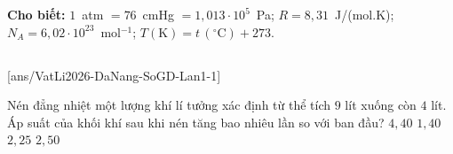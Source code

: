\def\CheDo{solcolor}%
\def\tenchuong{Sở GD\&ĐT Đà Nẵng -- Lần 1}
\def\thuonghieu{VẬT LÍ 12 -- Eduzy.com.vn}
\def\TachCauDS{1}
\def\TachCauLG{1}




	\noindent\textbf{Cho biết:} $1$~atm $=76$~cmHg $=1{,}013\cdot 10^5$~Pa; $R=8{,}31$~J/(mol.K); $N_A=6{,}02\cdot 10^{23}$~mol$^{-1}$; $T(\text{K})=t\,(^\circ\text{C})+273$.

	\noindent
	\subsection*{}
	\setcounter{ex}{0}
	[ans/VatLi2026-DaNang-SoGD-Lan1-1]

	\begin{ex}%
		Nén đẳng nhiệt một lượng khí lí tưởng xác định từ thể tích $9$ lít xuống còn $4$ lít. Áp suất của khối khí sau khi nén tăng bao nhiêu lần so với ban đầu?
		\choice
		{$4{,}40$}
		{$1{,}40$}
		{\True $2{,}25$}
		{$2{,}50$}
	\end{ex}

